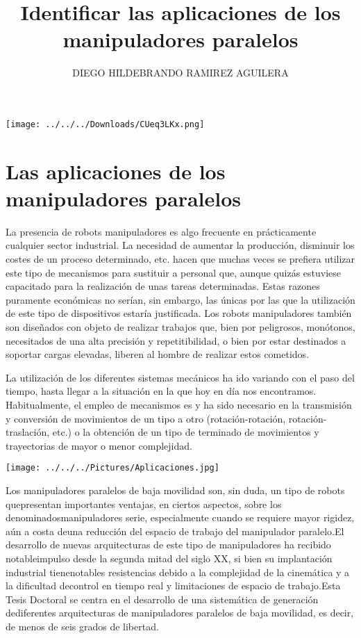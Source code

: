 \documentclass[12pt,a4paper]{article}
\author{DIEGO HILDEBRANDO RAMIREZ AGUILERA}
\title{Identificar las aplicaciones de los manipuladores paralelos}
\begin{document}
\maketitle

\texttt{[image: ../../../Downloads/CUeq3LKx.png]} 
\clearpage

\section{Las aplicaciones de los manipuladores paralelos}
La presencia de robots manipuladores es algo frecuente en prácticamente
cualquier sector industrial. La necesidad de aumentar la producción, disminuir
los costes de un proceso determinado, etc. hacen que muchas veces se prefiera
utilizar este tipo de mecanismos para sustituir a personal que, aunque quizás
estuviese capacitado para la realización de unas tareas determinadas.
Estas razones puramente económicas no serían, sin embargo, las únicas por
las que la utilización de este tipo de dispositivos estaría justificada. Los robots
manipuladores también son diseñados con objeto de realizar trabajos que, bien
por peligrosos, monótonos, necesitados de una alta precisión y repetitibilidad,
o bien por estar destinados a soportar cargas elevadas, liberen al hombre de
realizar estos cometidos.

La utilización de los diferentes sistemas mecánicos ha ido variando con el
paso del tiempo, hasta llegar a la situación en la que hoy en día nos encontramos. Habitualmente, el empleo de mecanismos es y ha sido necesario en la
transmisión y conversión de movimientos de un tipo a otro (rotación-rotación,
rotación-traslación, etc.) o la obtención de un tipo de terminado de movimientos y trayectorias de mayor o menor complejidad.


\texttt{[image: ../../../Pictures/Aplicaciones.jpg]} 

Los manipuladores paralelos de baja movilidad son, sin duda, un tipo de robots quepresentan importantes ventajas, en ciertos aspectos, sobre los denominadosmanipuladores serie, especialmente cuando se requiere mayor rigidez, aún a costa deuna reducción del espacio de trabajo del manipulador paralelo.El desarrollo de nuevas arquitecturas de este tipo de manipuladores ha recibido notableimpulso desde la segunda mitad del siglo XX, si bien su implantación industrial tienenotables resistencias debido a la complejidad de la cinemática y a la dificultad decontrol en tiempo real y limitaciones de espacio de trabajo.Esta Tesis Doctoral se centra en el desarrollo de una sistemática de generación dediferentes arquitecturas de manipuladores paralelos de baja movilidad, es decir, de menos de seis grados de libertad.
\end{document}

